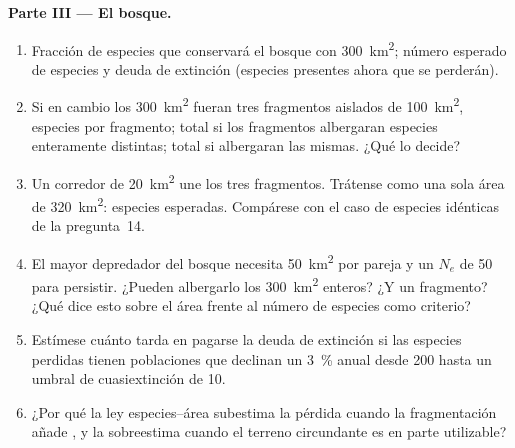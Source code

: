 \begin{problem}
\medskip
\noindent\textbf{Parte III --- El bosque.}
\begin{enumerate}[resume]
  \item Fracción de especies que conservará el bosque con
        \qty{300}{km^2}; número esperado de especies y deuda de
        extinción (especies presentes ahora que se perderán).
  \item Si en cambio los \qty{300}{km^2} fueran tres fragmentos
        aislados de \qty{100}{km^2}, especies por fragmento; total si
        los fragmentos albergaran especies enteramente distintas; total
        si albergaran las mismas. ¿Qué lo decide?
  \item Un corredor de \qty{20}{km^2} une los tres fragmentos.
        Trátense como una sola área de \qty{320}{km^2}: especies
        esperadas. Compárese con el caso de especies idénticas de la
        pregunta~14.
  \item El mayor depredador del bosque necesita \qty{50}{km^2} por
        pareja y un $N_{e}$ de 50 para persistir. ¿Pueden albergarlo los
        \qty{300}{km^2} enteros? ¿Y un fragmento? ¿Qué dice esto sobre
        el área frente al número de especies como criterio?
  \item Estímese cuánto tarda en pagarse la deuda de extinción si las
        especies perdidas tienen poblaciones que declinan un \qty{3}{\%}
        anual desde 200 hasta un umbral de cuasiextinción de 10.
  \item ¿Por qué la ley especies--área subestima la pérdida cuando la
        fragmentación añade , y la sobreestima cuando el
        terreno circundante es en parte utilizable?
\end{enumerate}


\end{problem}
